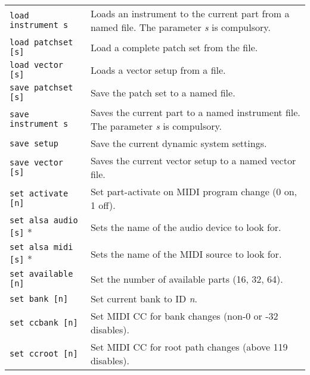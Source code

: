 \begin{table}[H]
\begin{tabular}{l l}
         \texttt{load instrument s} &
            Loads an instrument to the current part from a named file.
            The parameter \textsl{s} is compulsory. \\

         \texttt{load patchset [s]} &
            Load a complete patch set from the file. \\

         \texttt{load vector [s]} &
            Loads a vector setup from a file. \\

         \texttt{save patchset [s]} &
            Save the patch set to a named file. \\

         \texttt{save instrument s} &
            Saves the current part to a named instrument file.
            The parameter \textsl{s} is compulsory. \\

         \texttt{save setup} &
            Save the current dynamic system settings. \\

         \texttt{save vector [s]} &
            Saves the current vector setup to a named vector file. \\

         \texttt{set activate [n]} &
            Set part-activate on MIDI program change (0 on, 1 off). \\

         \texttt{set alsa audio [s]} * &
            Sets the name of the audio device to look for. \\

         \texttt{set alsa midi [s]} * &
            Sets the name of the MIDI source to look for. \\

         \texttt{set available [n]} &
            Set the number of available parts (16, 32, 64). \\

         \texttt{set bank [n]} &
            Set current bank to ID \textsl{n}. \\

         \texttt{set ccbank [n]} &
            Set MIDI CC for bank changes (non-0 or -32 disables). \\

         \texttt{set ccroot [n]} &
            Set MIDI CC for root path changes (above 119 disables). \\


\end{tabular}
\end{table}
